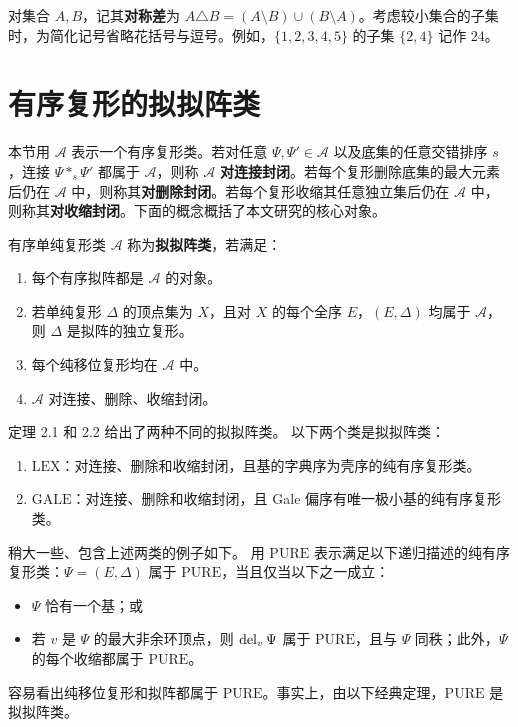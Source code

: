 对集合 $A,B$，记其\textbf{对称差}为 $A\triangle B=(A\setminus B)\cup(B\setminus A)$。考虑较小集合的子集时，为简化记号省略花括号与逗号。例如，$\{1,2,3,4,5\}$ 的子集 $\{2,4\}$ 记作 $24$。

\section{有序复形的拟拟阵类}
本节用 $\mathcal A$ 表示一个有序复形类。若对任意 $\Psi,\Psi'\in\mathcal A$ 以及底集的任意交错排序 $s$，连接 $\Psi*_s\Psi'$ 都属于 $\mathcal A$，则称 $\mathcal A$ \textbf{对连接封闭}。若每个复形删除底集的最大元素后仍在 $\mathcal A$ 中，则称其\textbf{对删除封闭}。若每个复形收缩其任意独立集后仍在 $\mathcal A$ 中，则称其\textbf{对收缩封闭}。下面的概念概括了本文研究的核心对象。

有序单纯复形类 $\mathcal A$ 称为\textbf{拟拟阵类}，若满足：
\begin{enumerate}
\item 每个有序拟阵都是 $\mathcal A$ 的对象。
\item 若单纯复形 $\Delta$ 的顶点集为 $X$，且对 $X$ 的每个全序 $E$，$(E,\Delta)$ 均属于 $\mathcal A$，则 $\Delta$ 是拟阵的独立复形。
\item 每个纯移位复形均在 $\mathcal A$ 中。
\item $\mathcal A$ 对连接、删除、收缩封闭。
\end{enumerate}

定理 2.1 和 2.2 给出了两种不同的拟拟阵类。
以下两个类是拟拟阵类：
\begin{enumerate}
\item $\mathrm{LEX}$：对连接、删除和收缩封闭，且基的字典序为壳序的纯有序复形类。
\item $\mathrm{GALE}$：对连接、删除和收缩封闭，且 Gale 偏序有唯一极小基的纯有序复形类。
\end{enumerate}

稍大一些、包含上述两类的例子如下。
用 $\mathrm{PURE}$ 表示满足以下递归描述的纯有序复形类：$\Psi=(E,\Delta)$ 属于 $\mathrm{PURE}$，当且仅当以下之一成立：
\begin{itemize}
\item $\Psi$ 恰有一个基；或
\item 若 $v$ 是 $\Psi$ 的最大非余环顶点，则 $\operatorname{del}_v\Psi$ 属于 $\mathrm{PURE}$，且与 $\Psi$ 同秩；此外，$\Psi$ 的每个收缩都属于 $\mathrm{PURE}$。
\end{itemize}
容易看出纯移位复形和拟阵都属于 $\mathrm{PURE}$。事实上，由以下经典定理，$\mathrm{PURE}$ 是拟拟阵类。

